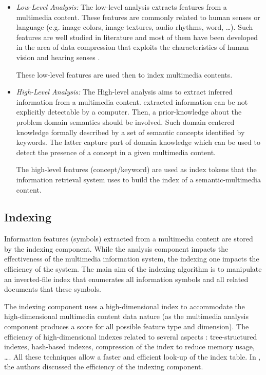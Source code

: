 		\begin{itemize}
			\item \textit{Low-Level Analysis: }
				The low-level analysis extracts features from a multimedia content. 
				These features are commonly related to human senses or language (e.g. image colors,
				image textures, audio rhythms, word, \dots{}). Such features are well studied in
				literature and most of them have been developed in the area of data compression 
				that exploits the characteristics of human vision and hearing senses 
				\citep{Foerstner1994,Nixon2012}. 

				These low-level features are used then to index multimedia contents.

			\item \textit{High-Level Analysis: }
				The High-level analysis aims to extract inferred information from a multimedia content. 
				 extracted information can be not explicitly detectable by a computer. 
				Then, a prior-knowledge about the problem domain semantics should be involved. 
				Such domain centered knowledge  formally described by a set of semantic concepts
				identified by keywords. The latter capture part of domain knowledge which can be used
				to detect the presence of a concept in a given multimedia content. 

				The high-level features (concept/keyword) are used as index tokens that the 
				information retrieval system uses to build the index of a semantic-multimedia content.
		\end{itemize}

		\subsection{Indexing}

		Information features (symbols) extracted from a multimedia content  are stored by the indexing
		component. While the analysis component impacts the effectiveness of the multimedia information 
		system, the indexing one impacts the efficiency of the system. The main aim of the indexing algorithm 
		is to manipulate an inverted-file index that enumerates all information symbols and all 
		related documents that  these symbols.

		The indexing component uses a high-dimensional index to accommodate the high-dimensional 
		multimedia content data nature (as the multimedia analysis component produces a score for 
		all possible feature type and dimension). The efficiency of high-dimensional indexes  
		related to several aspects \citep{Ai2013}: tree-structured indexes, hash-based indexes, compression of the
		index to reduce memory usage,  \dots{}. All these techniques allow a  faster and efficient
		look-up of the index table. In \citep{Baeza-Yates1999,Baeza-Yates2011}, the authors discussed 
		the efficiency of the indexing component.


